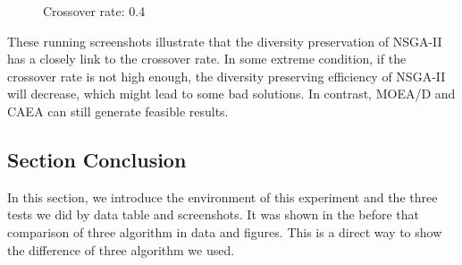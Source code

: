 \documentclass[a4paper, 11pt]{article}
\begin{document}
\begin{figure}[htb]
    \begin{center}
    \end{center}
    \caption{Crossover rate: 0.4}\label{fig:4rc}
\end{figure}
\noindent These running screenshots illustrate that the diversity preservation of NSGA-II has a closely link to the crossover rate.
In some extreme condition, if the crossover rate is not high enough, the diversity preserving efficiency of NSGA-II will
decrease, which might lead to some bad solutions. In contrast, MOEA/D and CAEA can still generate feasible results.


\subsection{Section Conclusion}
In this section, we introduce the environment of this experiment and the three tests we did by data table and screenshots.
It was shown in the before that comparison of three algorithm in data and figures. This is a direct way to show the difference
of three algorithm we used.
\newpage
\end{document}
